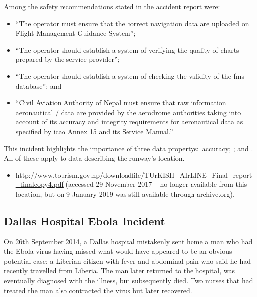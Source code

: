 Among the safety recommendations stated in the accident report were:
\begin{itemize}
  \item ``The operator must ensure that the correct navigation data are uploaded on Flight Management Guidance System''; 
  \item ``The operator should establish a system of verifying the quality of charts prepared by the service provider''; 
  \item ``The operator should establish a system of checking the validity of the \gls{fms} \gls{database}''; and
  \item ``Civil Aviation Authority of Nepal must ensure that raw \gls{information aeronautical} / data are provided by the aerodrome authorities taking into account of its accuracy and \gls{integrity} requirements for \gls{aeronautical data} as specified by \gls{icao} Annex 15 and its  Service Manual.''
\end{itemize}

This incident highlights the importance of three \cbstart\glspl{data property}:\cbend\ \gls{accuracy}; ; and . All of these apply to data describing the runway's location.

\begin{samepage}
\begin{itemize}
  \item \raggedright{\href{https://web.archive.org/web/20170709044727/http://www.tourism.gov.np/downloadfile/TUrKISH_AIrLINE_Final_report_finalcopy4.pdf}{http://www.tourism.gov.np/downloadfile/TUrKISH\_AIrLINE\_Final\_report\_finalcopy4.pdf} (accessed 29 November 2017 -- no longer available from this location, but on 9 January 2019 was still available through archive.org).}
\end{itemize}
\end{samepage}


\subsection{Dallas Hospital Ebola Incident} \label{bkm:incacc:dallasebola}
On 26th September 2014, a Dallas hospital mistakenly sent home a man who had the Ebola virus having missed what would have appeared to be an obvious potential case: a Liberian citizen with fever and abdominal pain who said he had recently travelled from Liberia. The man later returned to the hospital, was eventually diagnosed with the illness, but subsequently died. Two nurses that had treated the man also contracted the virus but later recovered.

